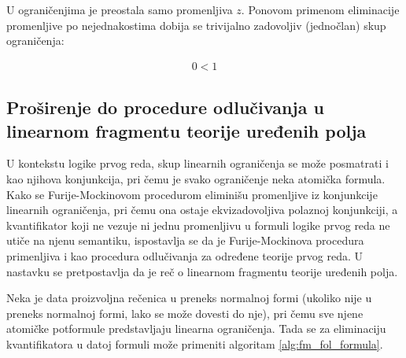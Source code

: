 \documentclass[a4paper,10pt]{article}
\begin{document}
U ograničenjima je preostala samo promenljiva $z$. Ponovom primenom eliminacije promenljive po nejednakostima dobija se trivijalno zadovoljiv (jednočlan) skup ograničenja:

\begin{equation}
\begin{gathered}
    \label{eq:example_s_4}
    0 < 1
\end{gathered}
\end{equation}

\subsection{Proširenje do procedure odlučivanja u linearnom fragmentu teorije uređenih polja}

U kontekstu logike prvog reda, skup linearnih ograničenja se može posmatrati i kao njihova konjunkcija, pri čemu je svako ograničenje neka atomička formula. Kako se Furije-Mockinovom procedurom eliminišu promenljive iz konjunkcije linearnih ograničenja, pri čemu ona ostaje ekvizadovoljiva polaznoj konjunkciji, a kvantifikator koji ne vezuje ni jednu promenljivu u formuli logike prvog reda ne utiče na njenu semantiku, ispostavlja se da je Furije-Mockinova procedura primenljiva i kao procedura odlučivanja za određene teorije prvog reda. U nastavku se pretpostavlja da je reč o linearnom fragmentu teorije uređenih polja.

Neka je data proizvoljna rečenica u preneks normalnoj formi (ukoliko nije u preneks normalnoj formi, lako se može dovesti do nje), pri čemu sve njene atomičke potformule predstavljaju linearna ograničenja. Tada se za eliminaciju kvantifikatora u datoj formuli može primeniti algoritam \ref{alg:fm_fol_formula}.
\end{document}
